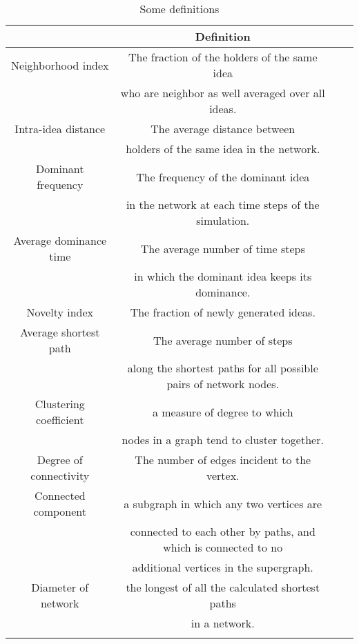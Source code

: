 \begin{table}[ht]
\caption{Some definitions} %
\centering %
\begin{tabular}{c c c c } %
\hline\hline %
 & Definition\\ [0.5ex] %
\hline %
Neighborhood index & The fraction of the holders of the same idea\\
\,&  who are neighbor as well averaged over all ideas.\\
\hline
Intra-idea distance& The average distance between \\
&holders of the same idea in the network.\\
\hline
Dominant frequency & The frequency of the dominant idea\\
& in the network at each time steps of the
simulation.\\
\hline
Average dominance time& The average number of time steps \\
&in which the dominant idea keeps its
dominance.\\
\hline
Novelty index& The fraction of newly generated ideas.\\
\hline
Average shortest path & The average number of steps\\
& along the shortest paths for all possible pairs of network nodes.\\
\hline
Clustering coefficient &  a measure of degree to which\\
& nodes in a graph tend to cluster together.\\
\hline
Degree of connectivity &  The number of edges incident to the vertex.\\
\hline
Connected component & a subgraph in which any two vertices are\\
 &connected to each other by paths, and which is connected to no\\
  &additional vertices in the supergraph.\\
\hline
Diameter of network& the longest of all the calculated shortest paths\\
& in a network.\\
\\ [1ex] %
\hline %
\end{tabular}
\label{Tab2} %
\end{table}

